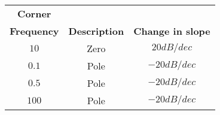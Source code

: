 \begin{tabular}{|c|c|c|}
\hline
     \textbf{Corner}&&\\ \textbf{Frequency} & \textbf{Description} & \textbf{Change in slope} \\
     \hline
     $10$ &  Zero & $20dB/dec$\\
     \hline
     $0.1$ & Pole & $-20dB/dec$\\
     \hline
     $0.5$ & Pole & $-20dB/dec$\\
     \hline
     $100$ & Pole & $-20dB/dec$\\
     \hline
\end{tabular}
